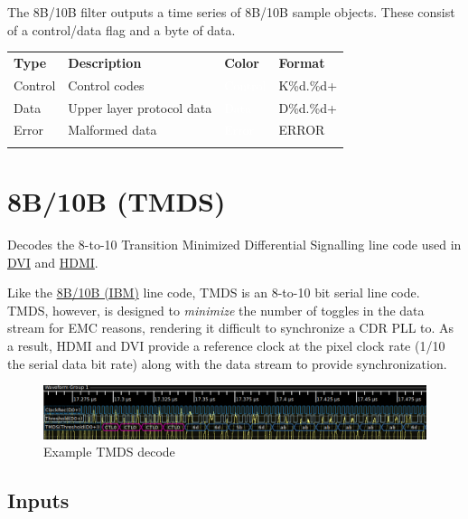 The 8B/10B filter outputs a time series of 8B/10B sample objects. These consist of a control/data flag and a byte of
data.

\begin{tabularx}{16cm}{lllX}
\thickhline
\textbf{Type} & \textbf{Description} & \textbf{Color} & \textbf{Format} \\
\thickhline
Control & Control codes & \cellcolor{control}\textcolor{white}{Control} & K\%d.\%d+ \\
\thickhline
Data & Upper layer protocol data & \cellcolor{data}\textcolor{white}{Data} & D\%d.\%d+ \\
\thickhline
Error & Malformed data & \cellcolor{error}\textcolor{white}{Error} & ERROR \\
\thickhline
\end{tabularx}

\pagebreak
\section{8B/10B (TMDS)}
\label{filter:tmds}

Decodes the 8-to-10 Transition Minimized Differential Signalling line code used in \hyperref[filter:dvi]{DVI} and
\hyperref[filter:hdmi]{HDMI}.

Like the \hyperref[filter:8b10b]{8B/10B (IBM)} line code, TMDS is an 8-to-10 bit serial line code. TMDS, however, is
designed to \emph{minimize} the number of toggles in the data stream for EMC reasons, rendering it difficult to
synchronize a CDR PLL to. As a result, HDMI and DVI provide a reference clock at the pixel clock rate (1/10 the serial
data bit rate) along with the data stream to provide synchronization.

\begin{figure}[h]
\centering
\includegraphics[width=16cm]{images/filters/tmds.png}
\caption{Example TMDS decode}
\label{filter_tmds}
\end{figure}

\subsection{Inputs}

